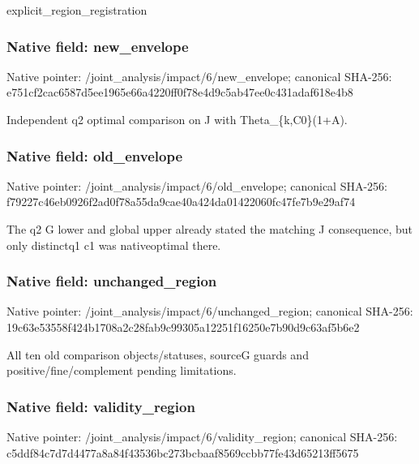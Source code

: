 \documentclass[10pt,a4paper]{article}
\begin{document}
\begingroup\raggedright\sloppy explicit\_\allowbreak{}region\_\allowbreak{}registration\par\endgroup

\subsubsection{Native field: new\_\allowbreak{}envelope}
Native pointer: /joint\_\allowbreak{}analysis/impact/6/new\_\allowbreak{}envelope; canonical SHA-256: e751cf2cac6587d5ee1965e66a4220ff0f78e4d9c5ab47ee0c431adaf618e4b8

\begingroup\raggedright\sloppy Independent q2 optimal comparison on J with Theta\_\allowbreak{}\{k,\allowbreak{}C0\}(1+A).\par\endgroup

\subsubsection{Native field: old\_\allowbreak{}envelope}
Native pointer: /joint\_\allowbreak{}analysis/impact/6/old\_\allowbreak{}envelope; canonical SHA-256: f79227c46eb0926f2ad0f78a55da9cae40a424da01422060fc47fe7b9e29af74

\begingroup\raggedright\sloppy The q2 G lower and global upper already stated the matching J consequence,\allowbreak{} but only distinctq1 c1 was nativeoptimal there.\par\endgroup

\subsubsection{Native field: unchanged\_\allowbreak{}region}
Native pointer: /joint\_\allowbreak{}analysis/impact/6/unchanged\_\allowbreak{}region; canonical SHA-256: 19c63e53558f424b1708a2c28fab9c99305a12251f16250e7b90d9c63af5b6e2

\begingroup\raggedright\sloppy All ten old comparison objects/\allowbreak{}statuses,\allowbreak{} sourceG guards and positive/\allowbreak{}fine/\allowbreak{}complement pending limitations.\par\endgroup

\subsubsection{Native field: validity\_\allowbreak{}region}
Native pointer: /joint\_\allowbreak{}analysis/impact/6/validity\_\allowbreak{}region; canonical SHA-256: c5ddf84c7d7d4477a8a84f43536bc273bcbaaf8569ccbb77fe43d65213ff5675
\end{document}
